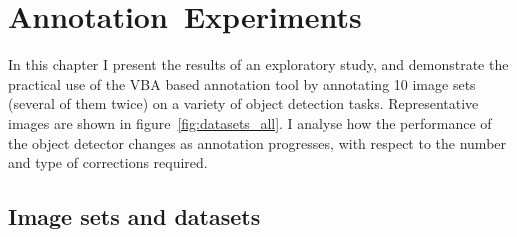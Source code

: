\chapter{Annotation~Experiments}
\label{chap:annotation} 

In this chapter I present the results of an exploratory study, and demonstrate the practical use of the \gls{VBA} based annotation tool by annotating 10 image sets (several of them twice) on a variety of object detection tasks. Representative images are shown in figure~\ref{fig:datasets_all}. I analyse how the performance of the object detector changes as annotation progresses, with respect to the number and type of corrections required.

\section{Image sets and datasets}

